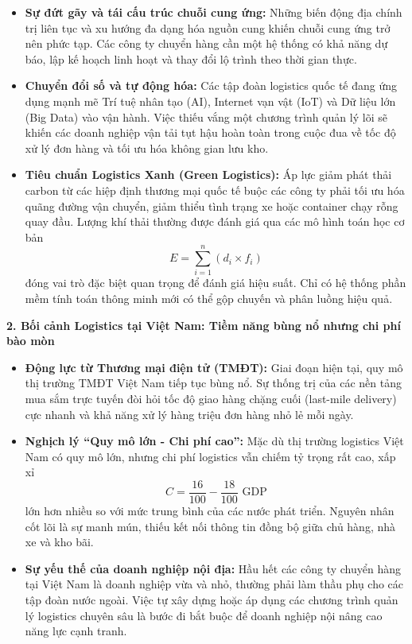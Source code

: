 \documentclass[12pt,a4paper]{article}
\begin{document}
\begin{itemize}[label={\scalebox{1.2}{$\circ$}}, leftmargin=2em]
    \item \textbf{Sự đứt gãy và tái cấu trúc chuỗi cung ứng:} Những biến động địa chính trị liên tục và xu hướng đa dạng hóa nguồn cung khiến chuỗi cung ứng trở nên phức tạp. Các công ty chuyển hàng cần một hệ thống có khả năng dự báo, lập kế hoạch linh hoạt và thay đổi lộ trình theo thời gian thực.
    \item \textbf{Chuyển đổi số và tự động hóa:} Các tập đoàn logistics quốc tế đang ứng dụng mạnh mẽ Trí tuệ nhân tạo (AI), Internet vạn vật (IoT) và Dữ liệu lớn (Big Data) vào vận hành. Việc thiếu vắng một chương trình quản lý lõi sẽ khiến các doanh nghiệp vận tải tụt hậu hoàn toàn trong cuộc đua về tốc độ xử lý đơn hàng và tối ưu hóa không gian lưu kho.
    \item \textbf{Tiêu chuẩn Logistics Xanh (Green Logistics):} Áp lực giảm phát thải carbon từ các hiệp định thương mại quốc tế buộc các công ty phải tối ưu hóa quãng đường vận chuyển, giảm thiểu tình trạng xe hoặc container chạy rỗng quay đầu. Lượng khí thải thường được đánh giá qua các mô hình toán học cơ bản \[ E = \sum_{i=1}^{n} \left( d_i \times f_i \right) \]đóng vai trò đặc biệt quan trọng để đánh giá hiệu suất. Chỉ có hệ thống phần mềm tính toán thông minh mới có thể gộp chuyến và phân luồng hiệu quả.
\end{itemize}

\vspace{0.5em}
\noindent\textbf{2. Bối cảnh Logistics tại Việt Nam: Tiềm năng bùng nổ nhưng chi phí bào mòn}

\begin{itemize}[label={\scalebox{1.2}{$\circ$}}, leftmargin=2em]
    \item \textbf{Động lực từ Thương mại điện tử (TMĐT):} Giai đoạn hiện tại, quy mô thị trường TMĐT Việt Nam tiếp tục bùng nổ. Sự thống trị của các nền tảng mua sắm trực tuyến đòi hỏi tốc độ giao hàng chặng cuối (last-mile delivery) cực nhanh và khả năng xử lý hàng triệu đơn hàng nhỏ lẻ mỗi ngày.
    \item \textbf{Nghịch lý ``Quy mô lớn - Chi phí cao'':} Mặc dù thị trường logistics Việt Nam có quy mô lớn, nhưng chi phí logistics vẫn chiếm tỷ trọng rất cao, xấp xỉ \[ C = \dfrac{16}{100} - \dfrac{18}{100} \text{ GDP} \]lớn hơn nhiều so với mức trung bình của các nước phát triển. Nguyên nhân cốt lõi là sự manh mún, thiếu kết nối thông tin đồng bộ giữa chủ hàng, nhà xe và kho bãi.
    \item \textbf{Sự yếu thế của doanh nghiệp nội địa:} Hầu hết các công ty chuyển hàng tại Việt Nam là doanh nghiệp vừa và nhỏ, thường phải làm thầu phụ cho các tập đoàn nước ngoài. Việc tự xây dựng hoặc áp dụng các chương trình quản lý logistics chuyên sâu là bước đi bắt buộc để doanh nghiệp nội nâng cao năng lực cạnh tranh.
\end{itemize}
\end{document}
